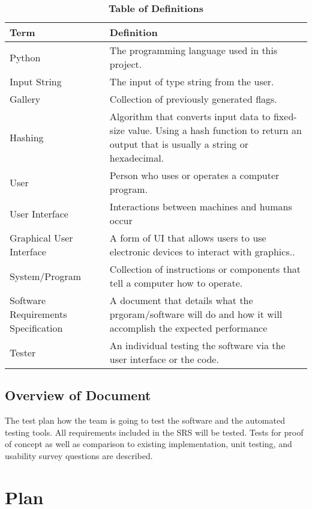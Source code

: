 \documentclass[12pt, titlepage]{article}
\newcommand{\newterm}[1]{\label{Term:#1} \MakeUppercase #1}
\begin{document}
\begin{table}[h]
\caption{\textbf{Table of Definitions}} \label{def}

\begin{tabularx}{\textwidth}{p{3cm}X}
\toprule
\textbf{Term} & \textbf{Definition}\\
\midrule
    \newterm{Python} & The programming language used in this project.\\
    \hline
    \newterm{Input String} & The input of type string from the user.\\
    \hline
    \newterm{Gallery} & Collection of previously generated flags.\\
    \hline
    \newterm{Hashing} & Algorithm that converts input data to fixed-size value. Using a hash function to return an output that is usually a string or hexadecimal.\\
    \hline
    \newterm{User} & Person who uses or operates a computer program.\\
    \hline
    \newterm{User Interface} & Interactions between machines and humans occur\\
    \hline
    \newterm{Graphical User Interface} & A form of UI that allows users to use electronic devices to interact with graphics..\\
    \hline
    \newterm{System/Program} & Collection of instructions or components that tell a computer how to operate.\\
    \hline
    \newterm{Software Requirements Specification} & A document that details what the prgoram/software will do and how it will accomplish the expected performance\\
    \hline
    \newterm{Tester} & An individual testing the software via the user interface or the code.\\
\bottomrule
\end{tabularx}
    
\end{table} 

\newpage
\subsection{Overview of Document}
The test plan how the team is going to test the software and the automated testing tools. All requirements included in the SRS will be tested. Tests for proof of concept as well as comparison to existing implementation, unit testing, and usability survey questions are described.

\section{Plan}
    
\end{document}

